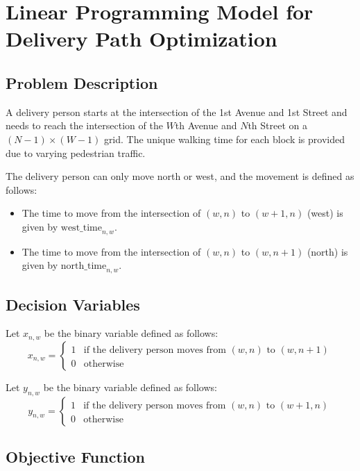 \documentclass{article}
\begin{document}
\section*{Linear Programming Model for Delivery Path Optimization}

\subsection*{Problem Description}

A delivery person starts at the intersection of the 1st Avenue and 1st Street and needs to reach the intersection of the \(W\)th Avenue and \(N\)th Street on a \( (N-1) \times (W-1) \) grid. The unique walking time for each block is provided due to varying pedestrian traffic.

The delivery person can only move north or west, and the movement is defined as follows:

\begin{itemize}
    \item The time to move from the intersection of \( (w, n) \) to \( (w+1, n) \) (west) is given by \( \text{west\_time}_{n,w} \).
    \item The time to move from the intersection of \( (w, n) \) to \( (w, n+1) \) (north) is given by \( \text{north\_time}_{n,w} \).
\end{itemize}

\subsection*{Decision Variables}

Let \( x_{n,w} \) be the binary variable defined as follows:
\[
x_{n,w} = 
\begin{cases} 
1 & \text{if the delivery person moves from } (w,n) \text{ to } (w,n+1)\\
0 & \text{otherwise}
\end{cases}
\]

Let \( y_{n,w} \) be the binary variable defined as follows:
\[
y_{n,w} = 
\begin{cases} 
1 & \text{if the delivery person moves from } (w,n) \text{ to } (w+1,n)\\
0 & \text{otherwise}
\end{cases}
\]

\subsection*{Objective Function}
\end{document}
